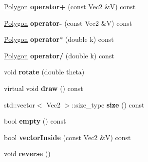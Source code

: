 \begin{DoxyCompactItemize}
\item 
\hypertarget{classg2c_1_1_polygon_a3b95c317b1725ac35d7609e80b40c872}{
\hyperlink{classg2c_1_1_polygon}{Polygon} {\bfseries operator+} (const Vec2 \&V) const }
\label{classg2c_1_1_polygon_a3b95c317b1725ac35d7609e80b40c872}

\item 
\hypertarget{classg2c_1_1_polygon_ad802be08ccb52c26ccce0914c69ade4a}{
\hyperlink{classg2c_1_1_polygon}{Polygon} {\bfseries operator-\/} (const Vec2 \&V) const }
\label{classg2c_1_1_polygon_ad802be08ccb52c26ccce0914c69ade4a}

\item 
\hypertarget{classg2c_1_1_polygon_aadd858a57915882aa74ffde8642f5dcf}{
\hyperlink{classg2c_1_1_polygon}{Polygon} {\bfseries operator$\ast$} (double k) const }
\label{classg2c_1_1_polygon_aadd858a57915882aa74ffde8642f5dcf}

\item 
\hypertarget{classg2c_1_1_polygon_a8abdf6051440b13a45b54e6ed009adc5}{
\hyperlink{classg2c_1_1_polygon}{Polygon} {\bfseries operator/} (double k) const }
\label{classg2c_1_1_polygon_a8abdf6051440b13a45b54e6ed009adc5}

\item 
\hypertarget{classg2c_1_1_polygon_a73304f75939cc48cbee288b413063668}{
void {\bfseries rotate} (double theta)}
\label{classg2c_1_1_polygon_a73304f75939cc48cbee288b413063668}

\item 
\hypertarget{classg2c_1_1_polygon_af0e5941fad20f8b667469f6f071e6cdf}{
virtual void {\bfseries draw} () const }
\label{classg2c_1_1_polygon_af0e5941fad20f8b667469f6f071e6cdf}

\item 
\hypertarget{classg2c_1_1_polygon_abe399dda79a4d649bde0f344f29062c6}{
std::vector$<$ Vec2 $>$::size\_\-type {\bfseries size} () const }
\label{classg2c_1_1_polygon_abe399dda79a4d649bde0f344f29062c6}

\item 
\hypertarget{classg2c_1_1_polygon_a92913e9720d273ec4a63d83d202e9d18}{
bool {\bfseries empty} () const }
\label{classg2c_1_1_polygon_a92913e9720d273ec4a63d83d202e9d18}

\item 
\hypertarget{classg2c_1_1_polygon_a9ce886c8057af266710925b460491ce1}{
bool {\bfseries vectorInside} (const Vec2 \&V) const }
\label{classg2c_1_1_polygon_a9ce886c8057af266710925b460491ce1}

\item 
\hypertarget{classg2c_1_1_polygon_ac60348bbf39cc756ab0d500907c04cee}{
void {\bfseries reverse} ()}
\label{classg2c_1_1_polygon_ac60348bbf39cc756ab0d500907c04cee}


\end{DoxyCompactItemize}
